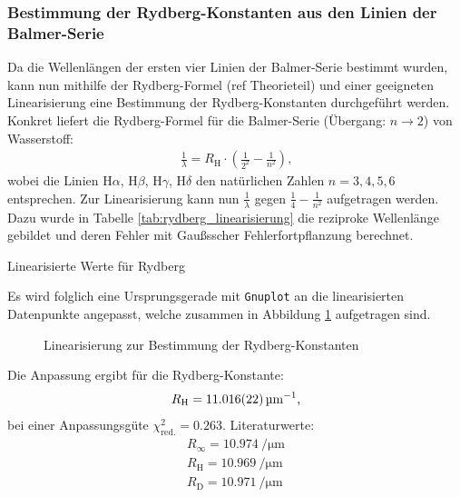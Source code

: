 \documentclass[11pt, a4paper]{article}
\numberwithin{equation}{section}
\begin{document}
\subsubsection{Bestimmung der Rydberg-Konstanten aus den Linien der Balmer-Serie}
Da die Wellenlängen der ersten vier Linien der Balmer-Serie bestimmt wurden, kann nun mithilfe der Rydberg-Formel (ref Theorieteil) und einer geeigneten Linearisierung eine Bestimmung der Rydberg-Konstanten durchgeführt werden.
Konkret liefert die Rydberg-Formel für die Balmer-Serie (Übergang: $n \rightarrow 2$) von Wasserstoff:
\begin{align*}
	\frac{1}{\lambda} = R_\mathrm{H} \cdot \left(\frac{1}{2^2} - \frac{1}{n^2} \right) \text{,}
\end{align*}
wobei die Linien H$\alpha$, H$\beta$, H$\gamma$, H$\delta$ den natürlichen Zahlen $n = 3, 4, 5, 6$ entsprechen.
Zur Linearisierung kann nun $\frac{1}{\lambda}$ gegen $\frac{1}{4} - \frac{1}{n^2}$ aufgetragen werden.
Dazu wurde in Tabelle \ref{tab:rydberg_linearisierung} die reziproke Wellenlänge gebildet und deren Fehler mit Gaußsscher Fehlerfortpflanzung berechnet.
\begin{table}[h]
	\centering
	
	\caption{Linearisierte Werte für Rydberg}
	\label{tab:rydberg_linearisierung}
\end{table}
Es wird folglich eine Ursprungsgerade mit \texttt{Gnuplot} an die linearisierten Datenpunkte angepasst, welche zusammen in Abbildung \ref{fig:rydberg_balmer} aufgetragen sind.
\begin{figure}[h]
	\centering
	
	\caption{Linearisierung zur Bestimmung der Rydberg-Konstanten}
	\label{fig:rydberg_balmer}
\end{figure}
Die Anpassung ergibt für die Rydberg-Konstante:
\begin{align*}
	R_\mathrm{H} = \SI{11.016 +- 0.022}{\per\micro\metre} \text{,}
\end{align*}
bei einer Anpassungsgüte $\chi_\mathrm{red.}^2 = \num{0.263}$.
Literaturwerte:
\begin{align*}
	R_\infty = \SI{10.974}{\per\micro\metre}\\
	R_\mathrm{H} = \SI{10.969}{\per\micro\metre}\\
	R_\mathrm{D} = \SI{10.971}{\per\micro\metre}\\
\end{align*}
\end{document}
